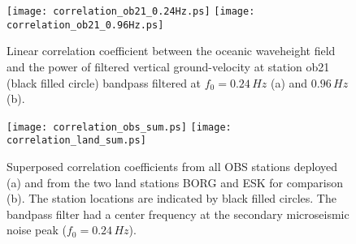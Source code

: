 \documentclass{article}
\renewcommand{\includegraphics}[2][1]{{\sf Figure: {\tt #1}}}
\begin{document}
{%
\begin{figure}
\centerline{
\texttt{[image: correlation\_ob21\_0.24Hz.ps]}
\hskip-1cm
\texttt{[image: correlation\_ob21\_0.96Hz.ps]}
}
\caption{
Linear correlation coefficient between the 
oceanic waveheight field
and the 
power of 
filtered vertical ground-velocity at station ob21 
(black filled circle)
bandpass filtered
at $f_0 = 0.24\, Hz$ (a) 
and
$0.96\, Hz$ (b).
}
\label{wavecorr1}
\end{figure}

\begin{figure}
\centerline{
\texttt{[image: correlation\_obs\_sum.ps]}
\hskip-1cm
\texttt{[image: correlation\_land\_sum.ps]}
}
\caption{
Superposed 
correlation coefficients from all OBS stations deployed (a)
and from the two land stations BORG and ESK for comparison
(b).
The station locations are indicated by black filled circles.
The bandpass filter had a center frequency at the 
secondary microseismic noise peak 
($f_0 = 0.24\, Hz$).
}
\label{wavecorr2}
\end{figure}

}
\end{document}
